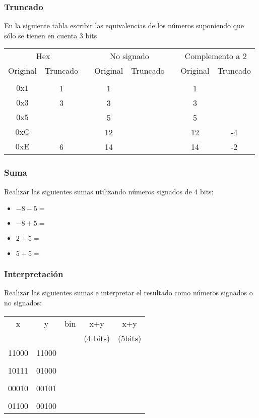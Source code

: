 \subsubsection{Truncado}
En la siguiente tabla escribir las equivalencias de los números suponiendo que sólo se tienen en cuenta 3 bits\\


\begin{tabular}{cccccccc}
  \multicolumn{2}{c}{Hex} & &\multicolumn{2}{c}{No signado}& &\multicolumn{2}{c}{Complemento a 2}\\
  Original&Truncado&&Original&Truncado&&Original&Truncado\\
  \cline{1-2}\cline{4-5}\cline{7-8}\\
  $\mathrm{0x1}$&1          &&1  &\underspace&&1 & \underspace \\
  $\mathrm{0x3}$&3          &&3  &\underspace&&3 & \underspace \\
  $\mathrm{0x5}$&\underspace&&5  &\underspace&&5 & \underspace \\
  $\mathrm{0xC}$&\underspace&&12 &\underspace&&12& -4\\
  $\mathrm{0xE}$&6          &&14 &\underspace&&14& -2\\
\end{tabular}

\subsubsection{Suma}
Realizar las siguientes sumas utilizando números signados de 4 bits:
\begin{itemize}
  \item $ -8-5= $
  \item $-8+5 = $
  \item $2+5  = $
  \item $5+5  = $
\end{itemize}

\subsubsection{Interpretación}
Realizar las siguientes sumas e interpretar el resultado como números signados o no signados:\\

\begin{tabular}{ccccc}
x&y&bin&x+y&x+y\\
&&&(4 bits)&(5bits)\\
11000&11000&\underspace&\underspace&\underspace\\
&&&&\\
10111&01000&\underspace&\underspace&\underspace\\
&&&&\\
00010&00101&\underspace&\underspace&\underspace\\
&&&&\\
01100&00100&\underspace&\underspace&\underspace\\
\end{tabular}


